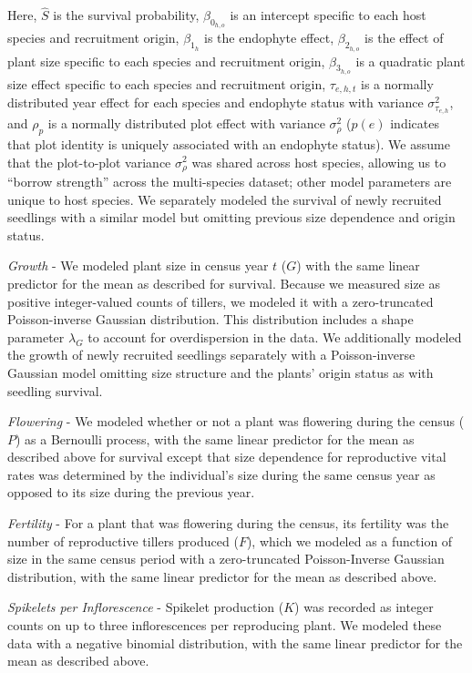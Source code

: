 \documentclass[lineno, sn-basic]{sn-jnl}%
\begin{document}
Here, $\hat{S}$ is the survival probability, $\beta_{0_{h,o}}$ is an intercept specific to each host species and recruitment origin, $\beta_{1_{h}}$ is the endophyte effect, $\beta_{2_{h,o}}$ is the effect of plant size specific to each species and recruitment origin, $\beta_{3_{h,o}}$ is a quadratic plant size effect specific to each species and recruitment origin, $\tau_{e,h,t}$ is a normally distributed year effect for each species and endophyte status with variance $\sigma^2_{\tau_{e,h}}$, and $\rho_{p}$ is a normally distributed plot effect with variance $\sigma^2_{\rho}$ ($p(e)$ indicates that plot identity is uniquely associated with an endophyte status).
We assume that the plot-to-plot variance $\sigma^2_{\rho}$ was shared across host species, allowing us to ``borrow strength'' across the multi-species dataset; other model parameters are unique to host species. 
We separately modeled the survival of newly recruited seedlings with a similar model but omitting previous size dependence and origin status. 


\emph{Growth} - We modeled plant size in census year $t$ ($G$) with the same linear predictor for the mean as described for survival.
Because we measured size as positive integer-valued counts of tillers, we modeled it with a zero-truncated Poisson-inverse Gaussian distribution.
This distribution includes a shape parameter $\lambda_G$ to account for overdispersion in the data.
We additionally modeled the growth of newly recruited seedlings separately with a Poisson-inverse Gaussian model omitting size structure and the plants' origin status as with seedling survival.

\emph{Flowering} - We modeled whether or not a plant was flowering during the census ($P$) as a Bernoulli process, with the same linear predictor for the mean as described above for survival except that size dependence for reproductive vital rates was determined by the individual's size during the same census year as opposed to its size during the previous year.

\emph{Fertility} - For a plant that was flowering during the census, its fertility was the number of reproductive tillers produced ($F$), which we modeled as a function of size in the same census period with a zero-truncated Poisson-Inverse Gaussian distribution, with the same linear predictor for the mean as described above. 

\emph{Spikelets per Inflorescence} - Spikelet production ($K$) was recorded as integer counts on up to three inflorescences per reproducing plant.
We modeled these data with a negative binomial distribution, with the same linear predictor for the mean as described above. 
\end{document}
